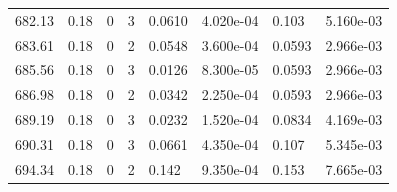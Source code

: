 \documentclass[preview]{standalone}
\begin{document}
{{{{{{{{{{\begin{tabular}{L{1.2cm}C{1.2cm} C{0.3cm}C{0.5cm} C{1.4cm}C{1.4cm} C{1.4cm}C{1.4cm}}
  682.13  &  0.18  & 0     &  3 &  0.0610  & 4.020e-04  & 0.103 &  5.160e-03   \\ 
  683.61  &  0.18  & 0     &  2 &  0.0548  & 3.600e-04  & 0.0593 &  2.966e-03   \\ 
  685.56  &  0.18  & 0     &  3 &  0.0126  & 8.300e-05  & 0.0593 &  2.966e-03   \\ 
  686.98  &  0.18  & 0     &  2 &  0.0342  & 2.250e-04  & 0.0593 &  2.966e-03   \\ 
  689.19  &  0.18  & 0     &  3 &  0.0232  & 1.520e-04  & 0.0834 &  4.169e-03   \\ 
  690.31  &  0.18  & 0     &  3 &  0.0661  & 4.350e-04  & 0.107 &  5.345e-03   \\ 
  694.34  &  0.18  & 0     &  2 &  0.142  & 9.350e-04  & 0.153 &  7.665e-03   \\ 
\hline 
\end{tabular} 

}}}}}}}}}}
\end{document}
